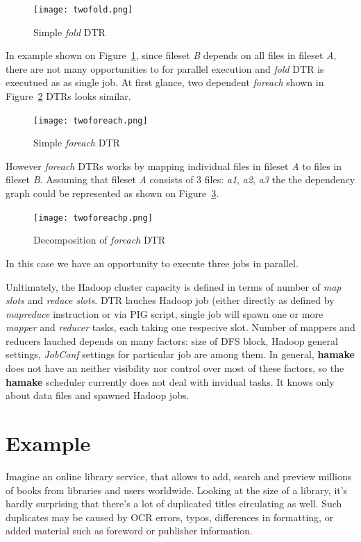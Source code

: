 \documentclass[10pt,conference,letterpaper]{IEEEtran}
\begin{document}
\begin{figure}[htp]
\centering
\texttt{[image: twofold.png]}
\caption{Simple \emph{fold} DTR}
\label{fig:fold1}
\end{figure}

In example shown on Figure~\ref{fig:fold1}, since fileset \textit{B}
depends on all files in fileset \textit{A}, there are not many
opportunities to for parallel execution and \emph{fold} DTR is
executued as as single job. At first glance, two dependent
\emph{foreach} shown in Figure~\ref{fig:foreach1} DTRs looks similar.

\begin{figure}[htp]
\centering
\texttt{[image: twoforeach.png]}
\caption{Simple \emph{foreach} DTR}
\label{fig:foreach1}
\end{figure}

However \emph{foreach} DTRs works by mapping individual files in
fileset \textit{A} to files in fileset \textit{B}. Assuming that
fileset \textit{A} consists of 3 files: \textit{a1}, \textit{a2},
\textit{a3} the the dependency graph could be represented as shown on
Figure~\ref{fig:foreach2}.

\begin{figure}[htp]
\centering
\texttt{[image: twoforeachp.png]}
\caption{Decomposition of \emph{foreach} DTR}
\label{fig:foreach2}
\end{figure}

In this case we have an opportunity to execute three jobs in parallel.

Unltimately, the Hadoop cluster capacity is defined in terms of number
of \textit{map slots} and \textit{reduce slots}.  DTR lauches Hadoop
job (either directly as defined by \emph{mapreduce} instruction or via
PIG script, single job will spawn one or more \emph{mapper} and
\emph{reducer} tasks, each taking one respecive slot. Number of
mappers and reducers lauched depends on many factors: size of DFS
block, Hadoop general settings, \emph{JobConf} settings for particular
job are among them. In general, \textbf{hamake} does not have an neither
visibility nor control over most of these factors, so the \textbf{hamake}
scheduler currently does not deal with invidual tasks. It knows only
about data files and spawned Hadoop jobs.

\section{Example}

Imagine an online library service, that allows to add, search and
preview millions of books from libraries and users worldwide. Looking
at the size of a library, it's hardly surprising that there's a lot of
duplicated titles circulating as well. Such duplicates may be caused
by OCR errors, typos, differences in formatting, or added material such as
foreword or publisher information.
\end{document}
